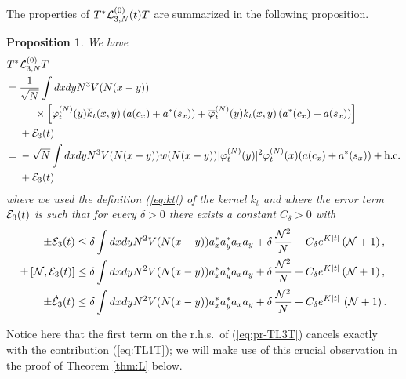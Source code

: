 \documentclass[11pt,a4paper]{article}
\newtheorem{proposition}[thm]{Proposition}
\newcommand{\ech}[2]{#2}	%
\newcommand{\ekt}{e^{K\lvert t\rvert}}	%
\newcommand{\cE}{{\cal E}}
\newcommand{\cL}{{\cal L}}
\newcommand{\cN}{{\cal N}}
\begin{document}
The properties of $T^* \cL_{3,N}^{(0)} (t) T$ are summarized in the following proposition. 
\begin{proposition}\label{prop:TL3T}
We have
\begin{equation}\label{eq:pr-TL3T} \begin{split} T^* &\cL^{(0)}_{3,N} T \\ =  \; & \frac{1}{\sqrt{N}} 
\int dx dy N^3 V (N (x-y))  \\ & \hspace{.5cm} \times \left[ \varphi_t^{(N)} (y) \overline{k}_t (x,y)  \left( a (c_x) + a^* (s_x) \right)   + \overline{\varphi}_t^{(N)} (y) k_t (x,y)  \left( a^* (c_x) + a (s_x) \right)  \right] \\ &+ \cE_3 (t) \\
= \; &- \sqrt{N} \int dx dy N^3 V(N (x-y)) w(N (x-y)) |\varphi_t^{(N)} (y)|^2 \varphi_t^{(N)} (x) (a (c_x) + a^* (s_x)) + \text{h.c.} \\ &+ \cE_3 (t)
\end{split} \end{equation}
where we used the definition (\ref{eq:kt}) of the kernel $k_t$ and where the error term $\cE_3 (t)$ is such that for every $\delta > 0$ there exists a constant $C_\delta > 0$ with
\begin{equation}\label{eq:TL3T-cl}
\begin{split} \pm \cE_3 (t)  &\leq \delta \int dx dy N^2 V (N (x-y)) a_x^*
a_y^* a_x a_y + \delta \,\frac{\cN^2}{N} + C_\delta \ech{\| \varphi_t^{(N)}
\|_{H^2}^2}{\ekt} \left(\cN + 1\right), \\
\pm \left[ \cN , \cE_3 (t) \right] &\leq \delta \int dx dy N^2 V (N (x-y))
a_x^* a_y^* a_x a_y + \delta \,  \frac{\cN^2}{N} + C_\delta  \ech{\|
\varphi_t^{(N)} \|_{H^2}^2}{\ekt}  \left(\cN + 1\right), \\
\pm \dot{\cE}_3 (t) & \leq \delta \int dx dy N^2 V (N (x-y)) a_x^* a_y^* a_x a_y + \delta \, \frac{\cN^2}{N} 
\ech{\\ & \hspace{.5cm} + C_\delta \left( \| \varphi_t^{(N)} \|_{H^4}^2 \| \varphi_t^{(N)} \|_{H^2}^2 + \| \varphi_t^{(N)} \|_{H^2}^4 \right)}{+ C_\delta \ekt} \,  \left( \cN + 1\right).
\end{split} \end{equation}
\end{proposition}

Notice here that the first term on the r.h.s.\ of (\ref{eq:pr-TL3T}) cancels exactly with the contribution (\ref{eq:TL1T}); we will make use of this crucial observation in the proof of Theorem \ref{thm:L} below.
\end{document}
